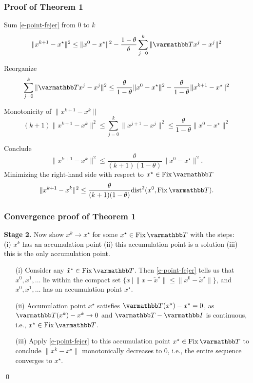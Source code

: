 \documentclass[10pt,mathserif]{beamer}
\begin{document}
\begin{frame}[plain]
\frametitle{Proof of Theorem 1}
\vspace{0.1in}
Sum \eqref{e-point-fejer} from $0$ to $k$
\[
\|x^{k+1} - x^\star\|^2 \leq
\|x^0 - x^\star\|^2 - \frac{1-\theta}{\theta}\sum_{j=0}^k
 \|\opT x^{j}-x^j\|^2
\]
\vspace{-0.2in}

Reorganize
\[
\sum_{j=0}^k \|\opT x^{j}-x^j\|^2\leq \frac{\theta}{1-\theta}\|x^0 - x^\star\|^2 -\frac{\theta}{1-\theta}\|x^{k+1} - x^\star\|^2
\]
\vspace{-0.1in}

Monotonicity of $\|x^{k+1}-x^k\|$
\[
(k+1)\|x^{k+1}-x^k\|^2
\le \sum_{j=0}^k\|x^{j+1}-x^j\|^2\leq \frac{\theta}{1-\theta}\|x^0 - x^\star\|^2
\]
\vspace{-0.2in}

Conclude
\[
\|x^{k+1}-x^k\|^2 \leq \frac{ \theta}
{(k+1) (1-\theta)}\|x^0 - x^\star\|^2.
\]
Minimizing the right-hand side with respect to $x^\star\in \fix \opT $
\[
\|x^{k+1}-x^k\|^2 \leq \frac{ \theta}
{(k+1) (1-\theta)}\dist^2(x^0,\fix \opT ).
\]
\end{frame}




\begin{frame}
\frametitle{Convergence proof of Theorem 1}
\textbf{Stage 2.}
Now show $x^k\rightarrow x^\star$ for some $x^\star\in \fix \opT $ with the steps:\\
(i) $x^k$ has an accumulation point (ii) this accumulation point is a solution (iii) this is the only accumulation point.

\begin{itemize}
\item[(i)]
Consider any $\tilde{x}^\star\in \fix \opT $.
Then \eqref{e-point-fejer}
tells us that $x^0,x^1,\dots$
lie within the compact set $\{x\,|\,\|x-\tilde{x}^\star\|\le \|x^0-\tilde{x}^\star\|\}$,
and $x^0,x^1,\dots$ has an accumulation point $x^\star$.
\item[(ii)]
Accumulation point $x^\star$ satisfies $\opT (x^\star)-x^\star=0$, as $\opT (x^k)-x^k\rightarrow 0$ and $\opT -\opI$ is continuous, i.e., $x^\star\in \fix \opT $.
\item[(iii)]
Apply \eqref{e-point-fejer} to this accumulation point $x^\star\in \fix \opT $
to conclude $\|x^k-x^\star\|$ monotonically decreases to $0$,
i.e., the entire sequence converges to $x^\star$.
\end{itemize}



\qed
\end{frame}
\end{document}
